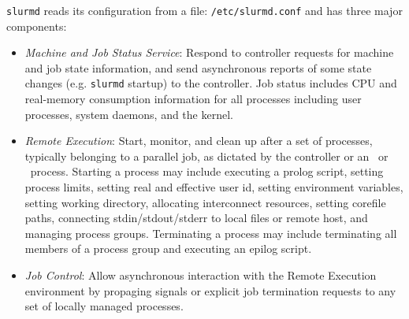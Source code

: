 {\tt slurmd} reads its configuration from a file: {\tt /etc/slurmd.conf}
and has three major components:

\begin{itemize}
\item {\em Machine and Job Status Service}:  Respond to controller 
requests for machine and job state information, and send asynchronous 
reports of some state changes (e.g. {\tt slurmd} startup) to the controller.
Job status includes CPU and real-memory consumption information for all 
processes including user processes, system daemons, and the kernel. 

\item {\em Remote Execution}: Start, monitor, and clean up after a set
of processes, typically belonging to a parallel job, as dictated by the
controller or an \srun\ or \scancel\ process. Starting a process may
include executing a prolog script, setting process limits, setting real
and effective user id, setting environment variables, setting working
directory, allocating interconnect resources, setting corefile paths,
connecting stdin/stdout/stderr to local files or remote host, and managing
process groups. Terminating a process may include terminating all members
of a process group and executing an epilog script.

\item {\em Job Control}: Allow asynchronous interaction with the
Remote Execution environment by propaging signals or explicit job
termination requests to any set of locally managed processes.

%
%
\end{itemize}

